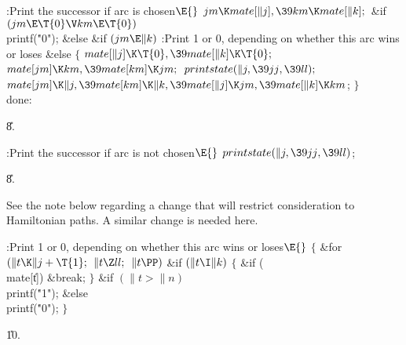 \Y\B\4:Print the successor if arc  is chosen\X${}\E{}$\6
$\\{jm}\K\\{mate}[\|j],\39\\{km}\K\\{mate}[\|k];{}$\6
\&{if} ${}(\\{jm}\E\T{0}\V\\{km}\E\T{0}){}$\1\5
\\{printf}(\.{"0"});\2\6
\&{else} \&{if} ${}(\\{jm}\E\|k){}$\1\5
\*:Print 1 or 0, depending on whether this arc wins or loses\X\2\6
\&{else}\5
${}\{{}$\1\6
${}\\{mate}[\|j]\K\T{0},\39\\{mate}[\|k]\K\T{0};{}$\6
${}\\{mate}[\\{jm}]\K\\{km},\39\\{mate}[\\{km}]\K\\{jm};{}$\6
${}\\{printstate}(\|j,\39\\{jj},\39\\{ll});{}$\6
${}\\{mate}[\\{jm}]\K\|j,\39\\{mate}[\\{km}]\K\|k,\39\\{mate}[\|j]\K\\{jm},\39%
\\{mate}[\|k]\K\\{km}{}$;\6
\4${}\}{}$\2\6
\\{done}:\par
\U8.\fi

\B{}:Print the successor if arc  is not chosen\X${}\E{}$\6
$\\{printstate}(\|j,\39\\{jj},\39\\{ll}){}$;\par
\U8.\fi

See the note below regarding a change that will restrict consideration
to Hamiltonian paths. A similar change is needed here.

\Y\B\4\*:Print 1 or 0, depending on whether this arc wins or loses\X${}%
\E{}$\6
${}\{{}$\1\6
\&{for} ${}(\|t\K\|j+\T{1};{}$ ${}\|t\Z\\{ll};{}$ ${}\|t\PP){}$\1\6
\&{if} ${}(\|t\I\|k){}$\5
${}\{{}$\1\6
\&{if} (\\{mate}[\|t])\1\5
\&{break};\2\6
\4${}\}{}$\2\2\6
\&{if} ${}(\|t>\|n){}$\1\5
\\{printf}(\.{"1"});\2\6
\&{else}\1\5
\\{printf}(\.{"0"});\2\6
\4${}\}{}$\2\par
\U10.\fi

